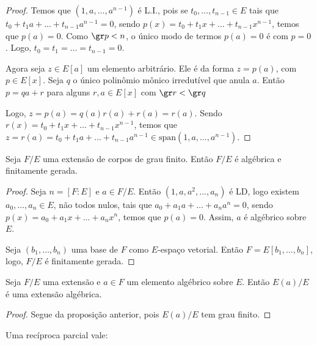 \begin{proof}
    Temos que $(1, a, \dots, a^{n-1})$ é L.I., pois se $t_0, \dots, t_{n-1} \in E$ tais que $t_0+t_1a+\dots+t_{n-1}a^{n-1}=0$, sendo $p(x)=t_0+t_1x+\dots+t_{n-1}x^{n-1}$, temos que $p(a)=0$. Como $\gr p<n$, o único modo de termos $p(a)=0$ é com $p=0$. Logo, $t_0=t_1=\dots=t_{n-1}=0$.

    Agora seja $z \in E[a]$ um elemento arbitrário. Ele é da forma $z=p(a)$, com $p \in E[x]$. Seja $q$ o único polinômio mônico irredutível que anula $a$. Então $p=qa+r$ para alguns $r, a \in E[x]$ com $\gr r<\gr q$
    
    Logo, $z=p(a)=q(a)r(a)+r(a)=r(a)$. Sendo $r(x)=t_0+t_1x+\dots+t_{n-1}x^{n-1}$, temos que $z=r(a)=t_0+t_1a+\dots+t_{n-1}a^{n-1} \in \text{span}(1, a, \dots, a^{n-1})$.

\end{proof}

\begin{prop}
    Seja $F/E$ uma extensão de corpos de grau finito. Então $F/E$ é algébrica e finitamente gerada.
\end{prop}
\begin{proof}
    Seja $n=[F:E]$ e $a \in F/E$. Então $(1, a, a^2, \dots, a_{n})$ é LD, logo existem $a_0, \dots, a_n \in E$, não todos nulos, tais que $a_0+a_1a+\dots+a_na^n=0$, sendo $p(x)=a_0+a_1x+\dots+a_nx^n$, temos que $p(a)=0$.
    Assim, $a$ é algébrico sobre $E$.

    Seja $(b_1, \dots, b_n)$ uma base de $F$ como $E$-espaço vetorial. Então $F=E[b_1, \dots, b_n]$, logo, $F/E$ é finitamente gerada.
\end{proof}


\begin{corol}
    Seja $F/E$ uma extensão e $a \in F$ um elemento algébrico sobre $E$. Então $E(a)/E$ é uma extensão algébrica.
\end{corol}
\begin{proof}
    Segue da proposição anterior, pois $E(a)/E$ tem grau finito.
\end{proof}

Uma recíproca parcial vale:

